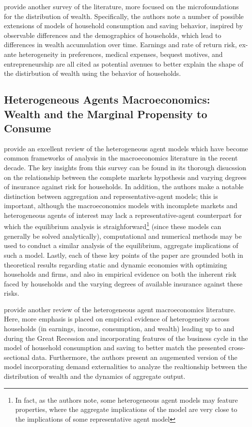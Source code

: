 \documentclass[\econtexRoot/Chp1]{subfiles}
\begin{document}
\par \cite{De_Nardi2017} provide another survey of the literature, more focused on the microfoundations for the distribution of wealth. Specifically, the authors note a number of possible extensions of models of household consumption and saving behavior, inspired by observable differences and the demographics of households, which lead to differences in wealth accumulation over time. Earnings and rate of return risk, ex-ante heterogeneity in preferences, medical expenses, bequest motives, and entrepreneurship are all cited as potential avenues to better explain the shape of the distirbution of wealth using the behavior of households.

\subsection{Heterogeneous Agents Macroeconomics: Wealth and the Marginal Propensity to Consume}

\par \cite{Guvenen2011} provide an excellent review of the heterogeneous agent models which have become common frameworks of analysis in the macroeconomics literature in the recent decade. The key insights from this survey can be found in its thorough disucssion on the relationship between the complete markets hypothesis and varying degrees of insurance against risk for households. In addition, the authors make a notable distinction between aggregation and representative-agent models; this is important, although the macroeconomics models with incomplete markets and heterogeneous agents of interest may lack a representative-agent counterpart for which the equilibrium analysis is straighforward\footnote{In fact, as the authors note, some heterogeneous agent models may feature  properties, where the aggregate implications of the model are very close to the implications of some representative agent model} (since these models can generally be solved analytically), computational and numerical methods may be used to conduct a similar analysis of the equilibrium, aggregate implications of such a model. Lastly, each of these key points of the paper are grounded both in theoretical results regarding static and dynamic economies with optimizing households and firms, and also in empirical evidence on both the inherent risk faced by households and the varying degrees of available insurance against these risks.

\par \cite{Krueger2016} provide another review of the heterogeneous agent macroeconomics literature. Here, more emphasis is placed on empirical evidence of heterogeneity across households (in earnings, income, consumption, and wealth) leading up to and during the Great Recession and incorporating features of the business cycle in the model of household consumption and saving to better match the presented cross-sectional data. Furthermore, the authors present an augemented version of the model incorporating demand externalities to analyze the realtionship between the distribution of wealth and the dynamics of aggregate output.
\end{document}
